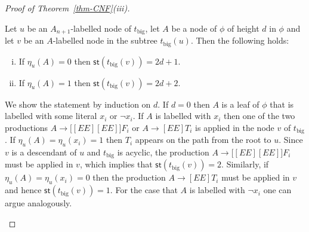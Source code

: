 \documentclass[a4paper,UKenglish,cleveref, autoref, thm-restate, numberwithinsect]{lipics-v2021}
\newcommand{\hs}{\mathsf{st}}
\begin{document}
\begin{proof}[Proof of Theorem~\ref{thm-CNF}(iii)]
 \begin{claim} \label{claim-eta_t}
 Let  $u$ be an $A_{n+1}$-labelled node of $t_{\text{big}}$, let $A$ be a node of $\phi$ of height $d$ in $\phi$
 and let $v$ be an $A$-labelled node in the subtree $t_{\text{big}}(u)$. Then the following holds:
\begin{enumerate}[(i)]
\item If $\eta_u(A) = 0$ then $\hs(t_{\text{big}}(v)) = 2d+1$.
\item If $\eta_u(A) = 1$ then $\hs(t_{\text{big}}(v)) = 2d+2$.
\end{enumerate} 
\end{claim}

\begin{claimproof}
We show the statement by induction on $d$. If $d=0$ then $A$ is a leaf of $\phi$ that is labelled with some 
literal $x_i$ or $\neg x_i$. If $A$ is labelled with $x_i$ then one of the two productions 
$A \to \big[ [EE][EE] \big] F_i$ or $A \to  [EE] T_i$ is applied in the node $v$ of  $t_{\text{big}}$.
If $\eta_u(A) = \eta_u(x_i) = 1$ then $T_i$ appears on the path from the root to $u$. Since $v$ is a descendant
of $u$ and $t_{\text{big}}$ is acyclic, the production $A \to \big[ [EE][EE] \big] F_i$ must be applied in $v$,
which implies that $\hs(t_{\text{big}}(v)) = 2$. Similarly, if 
$\eta_u(A) =  \eta_u(x_i) = 0$ then the production $A \to  [EE] T_i$ must be applied in $v$ and hence $\hs(t_{\text{big}}(v)) = 1$.
For the case that $A$ is labelled with $\neg x_i$ one can argue analogously.


\end{claimproof}
\end{proof}
\end{document}
